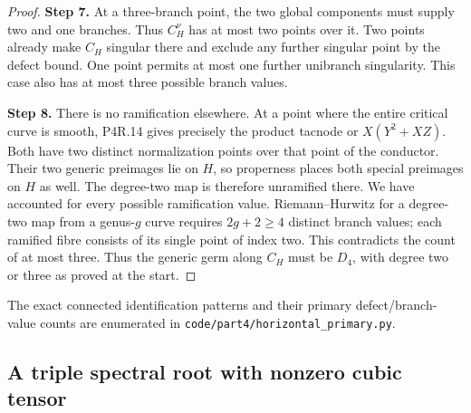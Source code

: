 \begin{proof}
\noindent\textbf{Step 7.} At a three-branch point, the two global components must
supply two and one branches. Thus $C_H^\nu$ has at most
two points over it. Two points already make $C_H$ singular
there and exclude any further singular point by the defect
bound. One point permits at most one further unibranch
singularity. This case also has at most three possible
branch values.

\noindent\textbf{Step 8.} There is no ramification elsewhere. At a point where the
entire critical curve is smooth, P4R.14 gives precisely
the product tacnode or $X(Y^2+XZ)$. Both have two distinct
normalization points over that point of the conductor.
Their two generic preimages lie on $H$, so properness
places both special preimages on $H$ as well. The
degree-two map is therefore unramified there. We have
accounted for every possible ramification value.
Riemann--Hurwitz for a degree-two map from a genus-$g$
curve requires $2g+2\ge4$ distinct branch values; each
ramified fibre consists of its single point of index two.
This contradicts the count of at most three. Thus the
generic germ along $C_H$ must be $D_4$, with degree two
or three as proved at the start.
\end{proof}

The exact connected identification patterns and their primary
defect/branch-value counts are enumerated in
\texttt{code/part4/horizontal\_primary.py}.


\subsection{A triple spectral root with nonzero cubic tensor}

